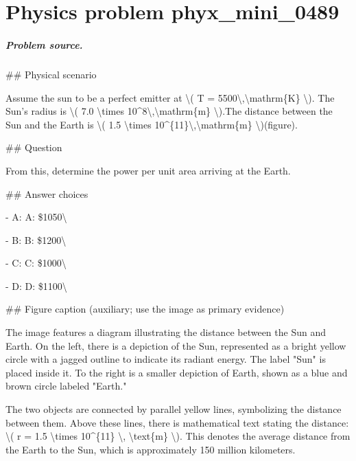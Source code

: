 
\chapter{Physics problem phyx\_mini\_0489}
\label{ch:PhyXMiniProblems_problem_phyx_mini_0489}

\paragraph{Problem source.}
\#\# Physical scenario

Assume the sun to be a perfect emitter at \textbackslash{}( T = 5500\textbackslash{},\textbackslash{}mathrm\{K\} \textbackslash{}). The Sun's radius is \textbackslash{}( 7.0 \textbackslash{}times 10\textasciicircum{}8\textbackslash{},\textbackslash{}mathrm\{m\} \textbackslash{}).The distance between the Sun and the Earth is \textbackslash{}( 1.5 \textbackslash{}times 10\textasciicircum{}\{11\}\textbackslash{},\textbackslash{}mathrm\{m\} \textbackslash{})(figure).

\#\# Question

From this, determine the power per unit area arriving at the Earth.

\#\# Answer choices

- A: A: \$1050\textbackslash{}

- B: B: \$1200\textbackslash{}

- C: C: \$1000\textbackslash{}

- D: D: \$1100\textbackslash{}

\#\# Figure caption (auxiliary; use the image as primary evidence)

The image features a diagram illustrating the distance between the Sun and Earth. On the left, there is a depiction of the Sun, represented as a bright yellow circle with a jagged outline to indicate its radiant energy. The label "Sun" is placed inside it. To the right is a smaller depiction of Earth, shown as a blue and brown circle labeled "Earth."

The two objects are connected by parallel yellow lines, symbolizing the distance between them. Above these lines, there is mathematical text stating the distance: \textbackslash{}( r = 1.5 \textbackslash{}times 10\textasciicircum{}\{11\} \textbackslash{}, \textbackslash{}text\{m\} \textbackslash{}). This denotes the average distance from the Earth to the Sun, which is approximately 150 million kilometers.

